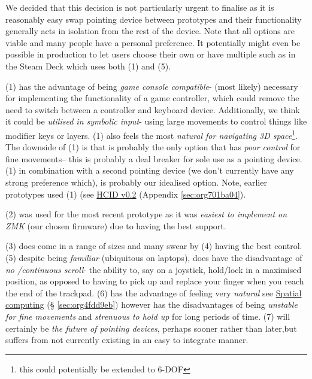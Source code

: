 \documentclass[logo,bsc,singlespacing,parskip]{infthesis}
\begin{document}
We decided that this decision is not particularly urgent to finalise as it is reasonably easy swap pointing device between prototypes and their functionality generally acts in isolation from the rest of the device.
Note that all options are viable and many people have a personal preference.
It potentially might even be possible in production to let users choose their own or have multiple such as in the Steam Deck \autocite{SteamDeck2022}  which uses both (1) and (5).

(1) has the advantage of being \emph{game console compatible}- (most likely) necessary for implementing the functionality of a game controller, which could remove the need to switch between a controller and keyboard device.
Additionally, we think it could be \emph{utilised in symbolic input}- using large movements to control things like modifier keys or layers.
(1) also feels the most \emph{natural for navigating 3D space}\footnote{this could potentially be extended to 6-DOF}.
The downside of (1) is that is probably the only option that has \emph{poor control} for fine movements-- this is probably a deal breaker for sole use as a pointing device.
(1) in combination with a second pointing device (we don't currently have any strong preference which), is probably our idealised option.
Note, earlier prototypes used (1) (see \hyperref[sec:org701ba04]{HCID v0.2} (Appendix \ref{sec:org701ba04}).

(2) was used for the most recent prototype as it was \emph{easiest to implement on ZMK} (our chosen firmware) due to having the best support.

(3) does come in a range of sizes and many swear by (4) having the best control.
(5) despite being \emph{familiar} (ubiquitous on laptops), does have the disadvantage of \emph{no /continuous scroll}- the ability to, say on a joystick, hold/lock in a maximised position, as opposed to having to pick up and replace your finger when you reach the end of the trackpad.
(6) has the advantage of feeling very \emph{natural} see \hyperref[sec:org4fdd9eb]{Spatial computing} (§ \ref{sec:org4fdd9eb}) however has the disadvantages of being \emph{unstable for fine movements} and \emph{strenuous to hold up} for long periods of time.
(7) will certainly be \emph{the future of pointing devices}, perhaps sooner rather than later,but suffers from not currently existing in an easy to integrate manner.
\end{document}
